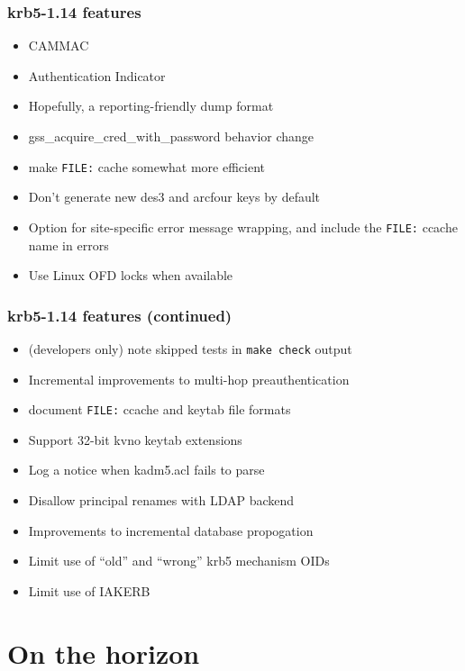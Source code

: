\documentclass{beamer}
\begin{document}
\begin{frame}[fragile]
\frametitle{krb5-1.14 features}
\begin{itemize}
\item{CAMMAC}
\item{Authentication Indicator}
\item{Hopefully, a reporting-friendly dump format}
\item{gss_acquire_cred_with_password behavior change}
\item{make \verb+FILE:+ cache somewhat more efficient}
\item{Don't generate new des3 and arcfour keys by default}
\item{Option for site-specific error message wrapping, and include the
	\verb+FILE:+ ccache name in errors}
\item{Use Linux OFD locks when available}
\end{itemize}
\end{frame}
\begin{frame}[fragile]
\frametitle{krb5-1.14 features (continued)}
\begin{itemize}
\item{(developers only) note skipped tests in \verb+make check+ output}
\item{Incremental improvements to multi-hop preauthentication}
\item{document \verb+FILE:+ ccache and keytab file formats}
\item{Support 32-bit kvno keytab extensions}
\item{Log a notice when kadm5.acl fails to parse}
\item{Disallow principal renames with LDAP backend}
\item{Improvements to incremental database propogation}
\item{Limit use of ``old'' and ``wrong'' krb5 mechanism OIDs}
\item{Limit use of IAKERB}
\end{itemize}
\end{frame}

\begin{frame}
\end{frame}

\section{On the horizon}
\end{document}
